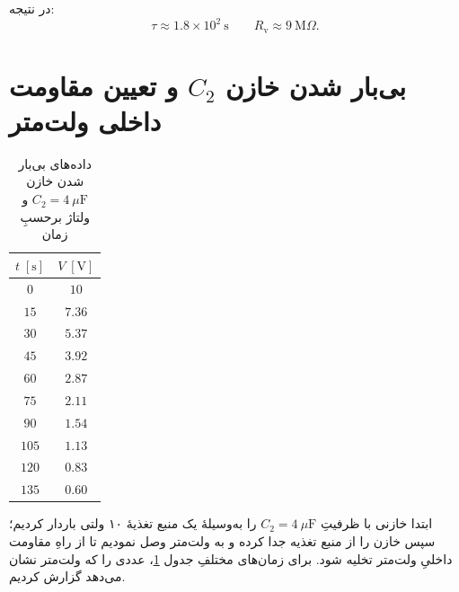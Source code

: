 \documentclass[a4paper, 11pt]{article}
\begin{document}
در نتیجه:
\begin{equation}
\boxed{\tau \approx 1.8\times10^{2}\ \mathrm{s}}
\qquad
\boxed{R_\mathrm{v} \approx 9~\mathrm{M}\Omega}.
\end{equation}



\section{بی‌بار شدن خازن $C_2$ و تعیین مقاومت داخلی ولت‌متر}
\begin{table}
\caption{داده‌های بی‌بار شدن خازن \(C_2 = 4~\mu\mathrm{F}\) و ولتاژ برحسبِ زمان}
\label{tab2}
\centering
\begin{tabular}{cc}
\hline
$t \;[\mathrm{s}]$ & $V \;[\mathrm{V}]$ \\
\hline
  $0$ & $10$ \\
 $15$ & $7.36$ \\
 $30$ & $5.37$ \\
 $45$ & $3.92$ \\
 $60$ & $2.87$ \\
 $75$ & $2.11$ \\
 $90$ & $1.54$ \\
$105$ & $1.13$ \\
$120$ & $0.83$ \\
$135$ & $0.60$ \\
\hline
\end{tabular}
\end{table}

ابتدا خازنی با ظرفیتِ $C_2 = 4~\mu\mathrm{F}$ را به‌وسیلهٔ یک منبع تغذیهٔ ۱۰ ولتی باردار کردیم؛ سپس خازن را از منبع تغذیه جدا کرده و به ولت‌متر وصل نمودیم تا از راهِ مقاومت داخلیِ ولت‌متر تخلیه شود. برای زمان‌های مختلفِ جدول \ref{tab2}، عددی را که ولت‌متر نشان می‌دهد گزارش کردیم.
\end{document}
